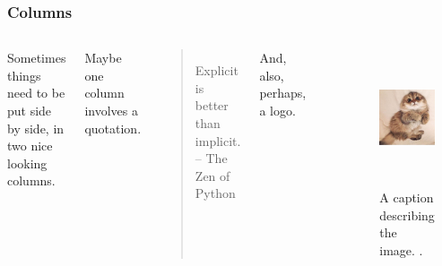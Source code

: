 
\begin{frame}
  \frametitle{Columns}
        \begin{columns}
                \column[t]{5cm}
                Sometimes things need to be put side by side, in two nice
                looking columns.

                Maybe one column involves a quotation.

                \begin{quote}
                        Explicit is better than implicit. -- The Zen of Python
                \end{quote}


                And, also, perhaps, a logo.
                \begin{center}
                        \includegraphics[height=0.2\textheight]{./images/arfc-logo}
                \end{center}
                \column[t]{5cm}
        \begin{figure}[htbp!]
        \begin{center}
      \includegraphics[height=4cm]{./images/kitten}
    \end{center}
          \caption{A caption describing the image. \cite{lastname_firstword_1900}.}
    \label{fig:kittenfigure}
  \end{figure}
        \end{columns}
\end{frame}

